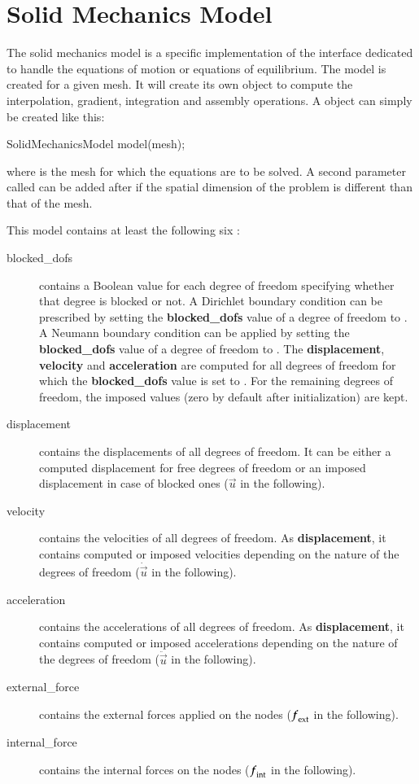 \chapter{Solid Mechanics Model\label{sect:smm}}

The solid mechanics model is a specific implementation of the
 interface dedicated to handle the equations of motion or
equations of equilibrium. The model is created for a given mesh.  It
will create its own  object to compute the interpolation,
gradient, integration and assembly operations.  A
 object can simply be created like this:
\begin{cpp}
  SolidMechanicsModel model(mesh);
\end{cpp}
where  is the mesh for which the equations are to be
solved. A second parameter called  can be
added after  if the spatial dimension of the problem is
different than that of the mesh.

This model contains at least the following six :
\begin{description}
\item[blocked\_dofs] contains a Boolean value for each degree of
  freedom specifying whether that degree is blocked or not. A
  Dirichlet boundary condition can be prescribed by setting the
  \textbf{blocked\_dofs} value of a degree of freedom to .
  A Neumann boundary condition can be applied by setting the
  \textbf{blocked\_dofs} value of a degree of freedom to .
  The \textbf{displacement}, \textbf{velocity} and
  \textbf{acceleration} are computed for all degrees of freedom for
  which the \textbf{blocked\_dofs} value is set to . For
  the remaining degrees of freedom, the imposed values (zero by
  default after initialization) are kept.
\item[displacement] contains the displacements of all degrees of
  freedom. It can be either a computed displacement for free degrees
  of freedom or an imposed displacement in case of blocked ones
  ($\vec{u}$ in the following).
\item[velocity] contains the velocities of all degrees of freedom.  As
  \textbf{displacement}, it contains computed or imposed velocities
  depending on the nature of the degrees of freedom ($\dot{\vec{u}}$
  in the following).
\item[acceleration] contains the accelerations of all degrees of
  freedom. As \textbf{displacement}, it contains computed or imposed
  accelerations depending on the nature of the degrees of freedom
  ($\ddot{\vec{u}}$ in the following).
\item[external\_force] contains the external forces applied on the nodes
  ($\boldsymbol{f}_{{\mathrm{ext}}}$ in the following).
\item[internal\_force] contains the internal forces on the nodes
  ($\boldsymbol{f}_{{\mathrm{int}}}$ in the following).
\end{description}

